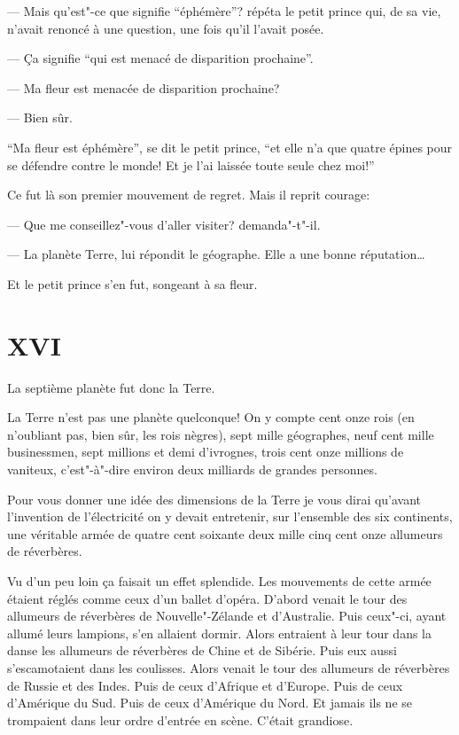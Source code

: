 \begin{Parallel}[p]{}{}
{--- Mais qu'est"-ce que signifie ``éphémère''? répéta le petit prince qui, de sa vie, n'avait renoncé à
une question, une fois qu'il l'avait posée.

--- Ça signifie ``qui est menacé de disparition prochaine''.

--- Ma fleur est menacée de disparition prochaine?

--- Bien sûr.

``Ma fleur est éphémère'', se dit le petit prince, ``et elle n'a que quatre épines pour se défendre contre
le monde! Et je l'ai laissée toute seule chez moi!''

Ce fut là son premier mouvement de regret. Mais
il reprit courage:

--- Que me conseillez"-vous d'aller visiter? demanda"-t"-il.

--- La planète Terre, lui répondit le géographe.
Elle a une bonne réputation\ldots{}

Et le petit prince s'en fut, songeant à sa fleur.

\section{XVI}

La septième planète fut donc la Terre.

La Terre n'est pas une planète quelconque! On y
compte cent onze rois (en n'oubliant pas, bien sûr,
les rois nègres), sept mille géographes, neuf cent
mille businessmen, sept millions et demi d'ivrognes,
trois cent onze millions de vaniteux, c'est"-à"-dire
environ deux milliards de grandes personnes.

Pour vous donner une idée des dimensions de la
Terre je vous dirai qu'avant l'invention de l'électricité
on y devait entretenir, sur l'ensemble des six continents, une véritable armée de quatre cent soixante
deux mille cinq cent onze allumeurs de réverbères.

Vu d'un peu loin ça faisait un effet splendide. Les
mouvements de cette armée étaient réglés comme
ceux d'un ballet d'opéra. D'abord venait le tour des
allumeurs de réverbères de Nouvelle"-Zélande et
d'Australie. Puis ceux"-ci, ayant allumé leurs lampions,
s'en allaient dormir. Alors entraient à leur tour dans la
danse les allumeurs de réverbères de Chine et de Sibérie.
Puis eux aussi s'escamotaient dans les coulisses.
Alors venait le tour des allumeurs de réverbères de
Russie et des Indes. Puis de ceux d'Afrique et d'Europe. Puis de ceux d'Amérique du Sud. Puis de ceux
d'Amérique du Nord. Et jamais ils ne se trompaient
dans leur ordre d'entrée en scène. C'était grandiose.

}
\end{Parallel}

